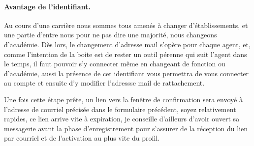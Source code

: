 \paragraph{Avantage de l'identifiant.} Au cours d'une carrière nous sommes tous amenés à changer d'établissements, et une partie d'entre nous pour ne pas dire une majorité, nous changeons d'académie. 
Dès lors, le changement d'adresse mail s'opère pour chaque agent, et, comme l'intention de la boite est de rester un outil pérenne qui suit l'agent dans le temps, il faut pouvoir s'y connecter même en changeant de fonction ou d'académie, aussi la présence de cet identifiant vous permettra de vous connecter au compte et ensuite d'y modifier l'adressse mail de rattachement.

Une fois cette étape prête, un lien vers la fenêtre de confirmation sera envoyé à l'adresse de courriel précisée dans le formulaire précédent, soyez relativement rapides, ce lien arrive vite à expiration, je conseille d'ailleurs d'avoir ouvert sa messagerie avant la phase d'enregistrement pour s'assurer de la réception du lien par courriel et de l'activation au plus vite du profil.

